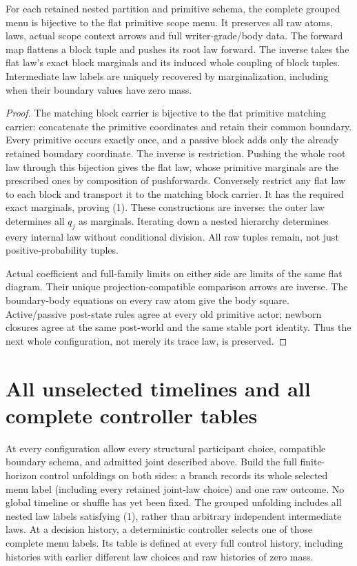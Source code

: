\documentclass[11pt]{article}
\begin{document}
\begin{theorem}
For each retained nested partition and primitive schema, the complete grouped menu is bijective to the flat primitive scope menu. It preserves all raw atoms, laws, actual scope context arrows and full writer-grade/body data. The forward map flattens a block tuple and pushes its root law forward. The inverse takes the flat law's exact block marginals and its induced whole coupling of block tuples. Intermediate law labels are uniquely recovered by marginalization, including when their boundary values have zero mass.
\end{theorem}
\begin{proof}
The matching block carrier is bijective to the flat primitive matching carrier: concatenate the primitive coordinates and retain their common boundary. Every primitive occurs exactly once, and a passive block adds only the already retained boundary coordinate. The inverse is restriction. Pushing the whole root law through this bijection gives the flat law, whose primitive marginals are the prescribed ones by composition of pushforwards. Conversely restrict any flat law to each block and transport it to the matching block carrier. It has the required exact marginals, proving (1). These constructions are inverse: the outer law determines all $q_j$ as marginals. Iterating down a nested hierarchy determines every internal law without conditional division. All raw tuples remain, not just positive-probability tuples.

Actual coefficient and full-family limits on either side are limits of the same flat diagram. Their unique projection-compatible comparison arrows are inverse. The boundary-body equations on every raw atom give the body square. Active/passive post-state rules agree at every old primitive actor; newborn closures agree at the same post-world and the same stable port identity. Thus the next whole configuration, not merely its trace law, is preserved.\end{proof}

\section{All unselected timelines and all complete controller tables}
At every configuration allow every structural participant choice, compatible boundary schema, and admitted joint described above. Build the full finite-horizon control unfoldings on both sides: a branch records its whole selected menu label (including every retained joint-law choice) and one raw outcome. No global timeline or shuffle has yet been fixed. The grouped unfolding includes all nested law labels satisfying (1), rather than arbitrary independent intermediate laws. At a decision history, a deterministic controller selects one of those complete menu labels. Its table is defined at every full control history, including histories with earlier different law choices and raw histories of zero mass.
\end{document}

